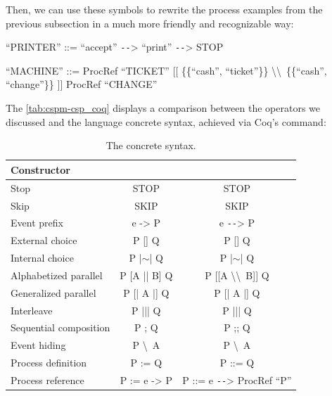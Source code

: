 Then, we can use these symbols to rewrite the process examples from the previous subsection in a much more friendly and recognizable way:

\begin{flushleft}
	``PRINTER'' ::= ``accept'' \texttt{-{}-}> ``print'' \texttt{-{}-}> STOP

	``MACHINE'' ::= ProcRef ``TICKET'' [[ \{\{``cash'', ``ticket''\}\} \textbackslash\textbackslash \ \{\{``cash'', ``change''\}\} ]] ProcRef ``CHANGE''
\end{flushleft}

The \autoref{tab:cspm-csp_coq} displays a comparison between the \CSPM{} operators we discussed and the \CSPcoq{} language concrete syntax, achieved via Coq's  command:

\begin{table}[htb]
	\begin{center}
		\caption[The \CSPcoq{} concrete syntax]{The \CSPcoq{} concrete syntax.}
		\label{tab:cspm-csp_coq}
		\begin{tabular}{ |l|c|c| }
			\hline
			Constructor & \CSPM{} & \CSPcoq{} \\
			\hline
			Stop & STOP & STOP \\ [0.5ex]
			Skip & SKIP & SKIP \\ [0.5ex]
			Event prefix & e -> P & e \texttt{-{}-}> P \\  [0.5ex]
			External choice & P [] Q & P [] Q \\  [0.5ex]
			Internal choice & P |$ \sim $| Q & P |$ \sim $| Q \\ [0.5ex]
			Alphabetized parallel & P [A || B] Q & P [[A \textbackslash\textbackslash \ B]] Q \\ [0.5ex]
			Generalized parallel & P [| A |] Q & P [| A |] Q \\ [0.5ex]
			Interleave & P ||| Q & P ||| Q \\ [0.5ex]
			Sequential composition & P ; Q & P ;; Q \\ [0.5ex]
			Event hiding & P \textbackslash \ A & P \textbackslash \ A \\ [0.5ex]
			Process definition & P := Q & P ::= Q \\ [0.5ex]
			Process reference & P := e -> P & P ::= e \texttt{-{}-}> ProcRef ``P'' \\ [0.5ex]
			\hline
		\end{tabular}
	\end{center}
\end{table}


